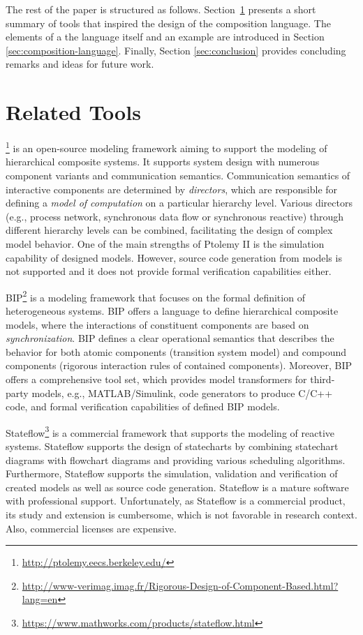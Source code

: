 The rest of the paper is structured as follows. Section~\ref{sec:related-tools} presents a short summary of tools that inspired the design of the composition language. The elements of a the language itself and an example are introduced in Section \ref{sec:composition-language}. Finally, Section \ref{sec:conclusion} provides concluding remarks and ideas for future work.

\section{Related Tools}
\label{sec:related-tools}

\ptolemy\footnote{\url{http://ptolemy.eecs.berkeley.edu/}} \cite{ptolemy,ptolemy2} is an open-source modeling framework aiming to support
the modeling of hierarchical composite systems. It supports system design with numerous component variants and communication semantics. Communication semantics of interactive components are determined by \emph{directors}, which are responsible for defining a \emph{model of computation} on a particular hierarchy level. Various directors (e.g., process network, synchronous data flow
or synchronous reactive) through different hierarchy levels can be combined, facilitating the design of complex model behavior. One of the main strengths of Ptolemy II is the simulation capability of designed models. However, source code generation from models is not supported and it does not provide formal verification capabilities either.

BIP\footnote{\url{http://www-verimag.imag.fr/Rigorous-Design-of-Component-Based.html?lang=en}} \cite{bip,bip3} is a modeling framework that focuses on the formal definition of heterogeneous systems.
BIP offers a language to define hierarchical composite models, where the interactions of constituent components are based on \emph{synchronization}. BIP defines a clear operational semantics that describes the behavior for both atomic components (transition system model) and compound components (rigorous interaction rules of contained components). Moreover, BIP offers a comprehensive tool set, which provides model transformers for third-party models, e.g., MATLAB/Simulink, code generators to produce C/C++ code, and formal
verification capabilities of defined BIP models.

Stateflow\footnote{\url{https://www.mathworks.com/products/stateflow.html}} \cite{stateflow} is a commercial framework that supports the modeling of
reactive systems. Stateflow supports the design of
statecharts by combining
statechart diagrams with flowchart diagrams and providing various scheduling
algorithms. Furthermore, Stateflow supports the simulation, validation and verification of created models as well as source code generation. Stateflow is a mature software with professional
support. Unfortunately, as Stateflow is a commercial product, its study and extension is cumbersome, which is not favorable in research context. Also, commercial licenses are expensive.


